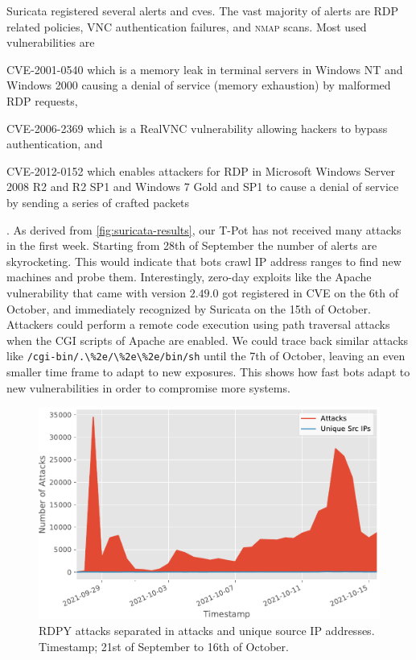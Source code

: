 Suricata registered several alerts and \acsp{cve}.
The vast majority of alerts are RDP related policies, VNC authentication failures, and \textsc{nmap} scans.
Most used vulnerabilities are
\begin{enumerate*}[label=(\roman*)]
    \item CVE-2001-0540\cite{CVE-2001-0540} which is a memory leak in terminal servers in Windows NT and Windows 2000 causing a denial of service (memory exhaustion) by malformed RDP requests,
    \item CVE-2006-2369\cite{CVE-2006-2369} which is a RealVNC vulnerability allowing hackers to bypass authentication, and
    \item CVE-2012-0152\cite{CVE-2012-0152} which enables attackers for RDP in Microsoft Windows Server 2008 R2 and R2 SP1 and Windows 7 Gold and SP1 to cause a denial of service by sending a series of crafted packets
\end{enumerate*}.
As derived from \autoref{fig:suricata-results}, our T-Pot has not received many attacks in the first week.
Starting from 28th of September the number of alerts are skyrocketing.
This would indicate that bots crawl IP address ranges to find new machines and probe them.
Interestingly, zero-day exploits like the Apache vulnerability \cite{CVE-2021-42013} that came with version $2.49.0$ got registered in CVE on the 6th of October, and immediately recognized by Suricata on the 15th of October.
Attackers could perform a remote code execution using path traversal attacks when the CGI scripts of Apache are enabled.
We could trace back similar attacks like \verb|/cgi-bin/.\%2e/\%2e\%2e/bin/sh| until the 7th of October, leaving an even smaller time frame to adapt to new exposures.
This shows how fast bots adapt to new vulnerabilities in order to compromise more systems.

\begin{figure}[ht]
    \centering
    \includegraphics[width=\textwidth]{figures/tpot-rdpy-port.pdf}
    \caption[RDPY results of T-Pot]{
        RDPY attacks separated in attacks and unique source IP addresses.
        Timestamp; 21st of September to 16th of October.
    }
    \label{fig:rdpy-results}
\end{figure}

